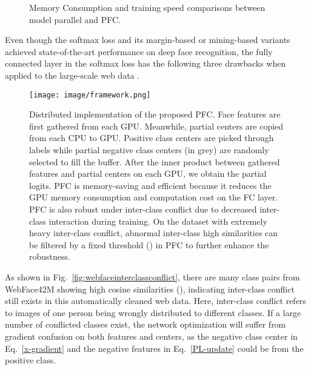 \documentclass[10pt,twocolumn,letterpaper]{article}
\begin{document}
\begin{figure}
\centering
{}
\vspace{-2mm}
\caption{Memory Consumption and training speed comparisons between model parallel and PFC.}
\vspace{-4mm}
\label{fig:memoryandspeed}
\end{figure}

Even though the softmax loss and its margin-based or mining-based variants achieved state-of-the-art performance on deep face recognition, the fully connected layer in the softmax loss has the following three drawbacks when applied to the large-scale web data \cite{zhu2021webface260m}.

\begin{figure*}
\centering
\texttt{[image: image/framework.png]}
\vspace{-2mm}
\caption{Distributed implementation of the proposed PFC. Face features are first gathered from each GPU. Meanwhile, partial centers are copied from each CPU to GPU. Positive class centers are picked through labels while partial negative class centers (in grey) are randomly selected to fill the buffer.
After the inner product between gathered features and partial centers on each GPU, we obtain the partial logits. PFC is memory-saving and efficient because it reduces the GPU memory consumption and computation cost on the FC layer. PFC is also robust under inter-class conflict due to decreased inter-class interaction during training. On the dataset with extremely heavy inter-class conflict, abnormal inter-class high similarities can be filtered by a fixed threshold () in PFC to further enhance the robustness. }
\vspace{-4mm}
\label{partial_fc}
\end{figure*}

As shown in Fig.~\ref{fig:webfaceinterclassconflict}, there are many class pairs from WebFace42M \cite{zhu2021webface260m} showing high cosine similarities (\eg ), indicating inter-class conflict still exists in this automatically cleaned web data. Here, inter-class conflict refers to images of one person being wrongly distributed to different classes. 
If a large number of conflicted classes exist, the network optimization will suffer from gradient confusion on both features and centers, as the negative class center  in Eq.~\ref{x-gradient} and the negative features  in Eq.~\ref{PL-update} could be from the positive class.
\end{document}
